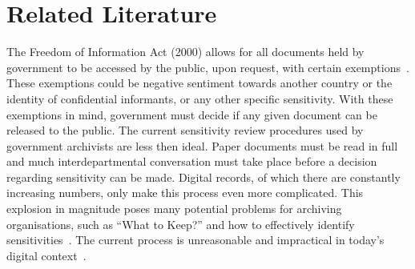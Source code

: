 \documentclass{l4proj}
\begin{document}

\chapter{Related Literature} \label{relatedliterature}
The Freedom of Information Act (2000) allows for all documents held by government to be accessed by the public, upon request, with certain exemptions~\cite{foi}. These exemptions could be negative sentiment towards another country or the identity of confidential informants, or any other specific sensitivity. With these exemptions in mind, government must decide if any given document can be released to the public.
The current sensitivity review procedures used by government archivists are less then ideal. Paper documents must be read in full and much interdepartmental conversation must take place before a decision regarding sensitivity can be made. Digital records, of which there are constantly increasing numbers, only make this process even more complicated. This explosion in magnitude poses many potential problems for archiving organisations, such as ``What to Keep?'' and how to effectively identify sensitivities~\cite{moss2012have}. The current process is unreasonable and impractical in today's digital context~\cite{allan2014record}.
\end{document}
